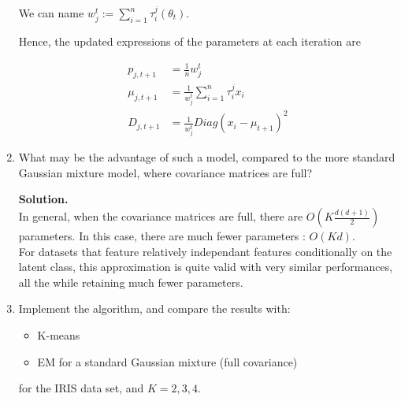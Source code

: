 \documentclass[a4paper, 11pt]{report}
\begin{document}
\begin{enumerate}
    We can name $w_j^t := \sum_{i=1}^{n} \tau_i^j(\theta_t)$.
    
    
    Hence, the updated expressions of the parameters at each iteration are 

    \begin{equation*}
        \boxed{\begin{aligned}
        p_{j,t+1} &= \frac{1}{n} w_j^t \\
        \mu_{j,t+1} &= \frac{1}{w_j^t} \sum_{i=1}^{n} \tau_i^j x_i \\
        D_{j,t+1} &= \frac{1}{w_j^t} Diag(x_i - \mu_{t+1})^{2}
        \end{aligned}}
    \end{equation*}
    
        
    \item What may be the advantage of such a model, compared to the more standard Gaussian mixture model, where covariance matrices are full? 
    
        \textbf{Solution.}\\
        In general, when the covariance matrices are full, there are $O \left( K\frac{d(d+1)}{2} \right)$ parameters. In this case, there are much fewer parameters : $O \left(Kd\right)$. \\
        For datasets that feature relatively independant features conditionally on the latent class, this approximation is quite valid with very similar performances, all the while retaining much fewer parameters.
        
    \item Implement the algorithm, and compare the results with: 
            \begin{itemize}
                \item K-means
                \item EM for a standard Gaussian mixture (full covariance)
            \end{itemize}
    for the IRIS data set, and $K = 2, 3, 4$. 
    

\end{enumerate}
\end{document}
